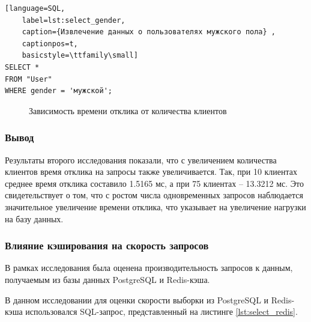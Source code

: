 \newpage
\begin{lstlisting}[language=SQL,
	label=lst:select_gender,
	caption={Извлечение данных о пользователях мужского пола} ,
	captionpos=t,
	basicstyle=\ttfamily\small]
SELECT * 
FROM "User" 
WHERE gender = 'мужской';
\end{lstlisting}

\begin{figure}[ht!]
	\begin{center}
	\end{center}
	\caption{Зависимость времени отклика от количества клиентов}
	\label{grp:dr2}
\end{figure}

\subsubsection*{\normalsize Вывод}

Результаты второго исследования показали, что с увеличением количества клиентов время отклика на запросы также увеличивается. Так, при 10 клиентах среднее время отклика составило 1.5165 мс, а при 75 клиентах -- 13.3212 мс. Это свидетельствует о том, что с ростом числа одновременных запросов наблюдается значительное увеличение времени отклика, что указывает на увеличение нагрузки на базу данных.

\subsubsection*{\normalsize Влияние кэширования на скорость запросов}

В рамках исследования была оценена производительность запросов к данным, получаемым из базы данных PostgreSQL и Redis-кэша. 

В данном исследовании для оценки скорости выборки из PostgreSQL и Redis-кэша использовался SQL-запрос, представленный на листинге \ref{lst:select_redis}.

